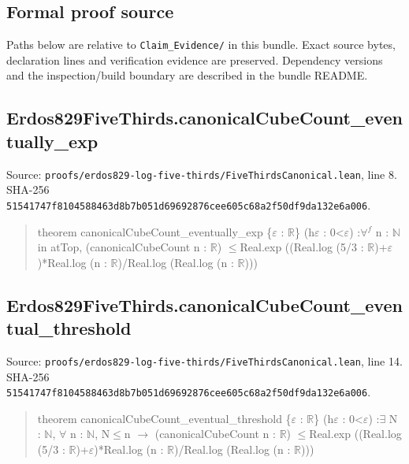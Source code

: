 \documentclass[11pt,a4paper]{article}
\begin{document}
\subsection{Formal proof source}
Paths below are relative to \texttt{Claim\_Evidence/} in this bundle. Exact source bytes, declaration lines and verification evidence are preserved. Dependency versions and the inspection/build boundary are described in the bundle README.

\subsection{Erdos829FiveThirds.canonicalCubeCount\_eventually\_exp}
Source: \texttt{proofs/erdos829-log-five-thirds/FiveThirdsCanonical.lean}, line 8. SHA-256 \texttt{51541747f8104588463d8b7b051d69692876cee605c68a2f50df9da132e6a006}.

\begin{quote}\small\ttfamily theorem canonicalCubeCount\_eventually\_exp \{\ensuremath{\varepsilon} : \ensuremath{\mathbb{R}}\} (h\ensuremath{\varepsilon} : 0<\ensuremath{\varepsilon}) :\newline \ensuremath{\forall}\ensuremath{^{f}} n : \ensuremath{\mathbb{N}} in atTop, (canonicalCubeCount n : \ensuremath{\mathbb{R}}) \ensuremath{\leq}\newline Real.exp ((Real.log (5/3 : \ensuremath{\mathbb{R}})+\ensuremath{\varepsilon})*Real.log (n : \ensuremath{\mathbb{R}})/Real.log (Real.log (n : \ensuremath{\mathbb{R}})))\end{quote}
\subsection{Erdos829FiveThirds.canonicalCubeCount\_eventual\_threshold}
Source: \texttt{proofs/erdos829-log-five-thirds/FiveThirdsCanonical.lean}, line 14. SHA-256 \texttt{51541747f8104588463d8b7b051d69692876cee605c68a2f50df9da132e6a006}.

\begin{quote}\small\ttfamily theorem canonicalCubeCount\_eventual\_threshold \{\ensuremath{\varepsilon} : \ensuremath{\mathbb{R}}\} (h\ensuremath{\varepsilon} : 0<\ensuremath{\varepsilon}) :\newline \ensuremath{\exists} N : \ensuremath{\mathbb{N}}, \ensuremath{\forall} n : \ensuremath{\mathbb{N}}, N\ensuremath{\leq}n \ensuremath{\to} (canonicalCubeCount n : \ensuremath{\mathbb{R}}) \ensuremath{\leq}\newline Real.exp ((Real.log (5/3 : \ensuremath{\mathbb{R}})+\ensuremath{\varepsilon})*Real.log (n : \ensuremath{\mathbb{R}})/Real.log (Real.log (n : \ensuremath{\mathbb{R}})))\end{quote}
\end{document}
